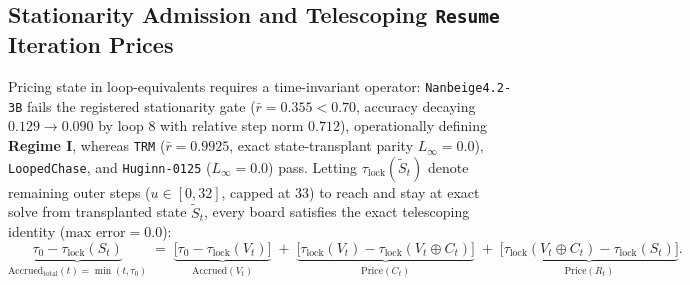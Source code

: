 \documentclass[10pt,letterpaper]{article}
\begin{document}
\subsection{Stationarity Admission and Telescoping \texttt{Resume} Iteration Prices}

Pricing state in loop-equivalents requires a time-invariant operator: \texttt{Nanbeige4.2-3B} fails the registered stationarity gate ($\bar{r}=0.355 < 0.70$, accuracy decaying $0.129 \to 0.090$ by loop 8 with relative step norm $0.712$), operationally defining \textbf{Regime I}, whereas \texttt{TRM} ($\bar{r}=0.9925$, exact state-transplant parity $L_\infty = 0.0$), \texttt{LoopedChase}, and \texttt{Huginn-0125} ($L_\infty = 0.0$) pass. Letting $\tau_{\mathrm{lock}}(\tilde{S}_t)$ denote remaining outer steps ($u \in [0, 32]$, capped at $33$) to reach and stay at exact solve from transplanted state $\tilde{S}_t$, every board satisfies the exact telescoping identity ($\text{max error} = 0.0$):
\begin{equation}
  \underbrace{\tau_0 - \tau_{\mathrm{lock}}(S_t)}_{\mathrm{Accrued}_{\mathrm{total}}(t) = \min(t,\tau_0)}
  \;=\;
  \underbrace{\bigl[\tau_0 - \tau_{\mathrm{lock}}(V_t)\bigr]}_{\mathrm{Accrued}(V_t)}
  \;+\;
  \underbrace{\bigl[\tau_{\mathrm{lock}}(V_t) - \tau_{\mathrm{lock}}(V_t \oplus C_t)\bigr]}_{\mathrm{Price}(C_t)}
  \;+\;
  \underbrace{\bigl[\tau_{\mathrm{lock}}(V_t \oplus C_t) - \tau_{\mathrm{lock}}(S_t)\bigr]}_{\mathrm{Price}(R_t)}.
  \label{eq:telescope}
\end{equation}
\end{document}
